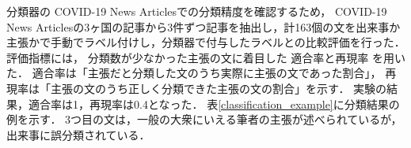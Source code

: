 \documentclass[a4paper, twocolumn, 10pt]{jarticle}
\begin{document}
分類器の
COVID-19 News Articlesでの分類精度を確認するため，
COVID-19 News Articlesの3ヶ国の記事から3件ずつ記事を抽出し，計163個の文を出来事か主張かで手動でラベル付けし，分類器で付与したラベルとの比較評価を行った．
評価指標には，
分類数が少なかった主張の文に着目した
適合率と再現率
を用いた．
適合率は「主張だと分類した文のうち実際に主張の文であった割合」，
再現率は「主張の文のうち正しく分類できた主張の文の割合」を示す．
実験の結果，適合率は1，再現率は0.4となった．
表\ref{classification_example}に分類結果の例を示す．
3つ目の文は，一般の大衆にいえる筆者の主張が述べられているが，出来事に誤分類されている．
\end{document}
